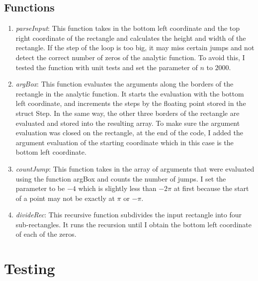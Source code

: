 \documentclass[11pt,reqno,oneside,a4paper]{article}
\begin{document}
\subsection{Functions}
	\begin{enumerate}
		\item \emph{parseInput}: 
		This function takes in the bottom left coordinate and the top right coordinate of the rectangle and calculates the height and width of the rectangle. 
		If the step of the loop is too big, it may miss certain jumps and not detect the correct number of zeros of the analytic function.
		To avoid this, I tested the function with unit tests and set the parameter of $n$ to $2000.$ 
		
		\item \emph{argBox}:
		This function evaluates the arguments along the borders of the rectangle in the analytic function. 
		It starts the evaluation with the bottom left coordinate, and increments the steps by the floating point stored in the struct Step. 
		In the same way, the other three borders of the rectangle are evaluated and stored into the resulting array. 
		To make sure the argument evaluation was closed on the rectangle, at the end of the code, I added the argument evaluation of the starting coordinate which in this case is the bottom left coordinate.
		
		\item \emph{countJump}: 
		This function takes in the array of arguments that were evaluated using the function argBox and counts the number of jumps.
		I set the parameter to be $-4$ which is slightly less than $-2\pi$ at first because the start of a point may not be exactly at $\pi$ or $-\pi.$ 
		
		\item \emph{divideRec}:
		This recursive function subdivides the input rectangle into four sub-rectangles.
		It runs the recursion until I obtain the bottom left coordinate of each of the zeros. 
		
		
	\end{enumerate}

\section{Testing}
	
\end{document}
